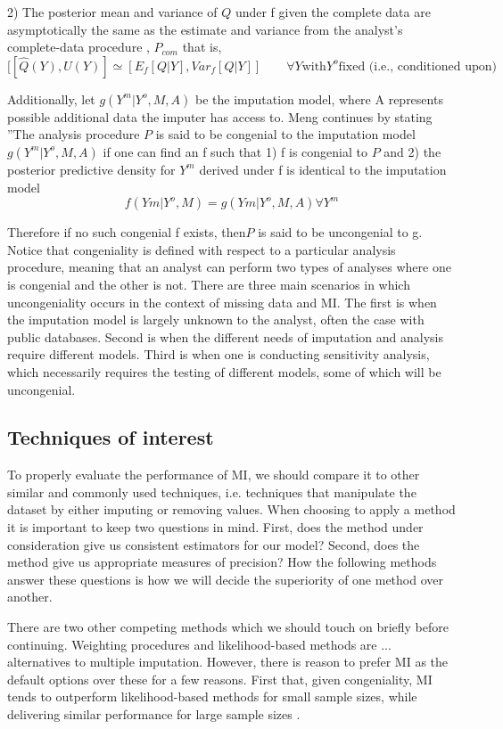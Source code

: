 \documentclass{article}
\begin{document}
	2)  The posterior mean and variance of $Q$ under
	f given the complete data are asymptotically the
	same as the estimate and variance from the analyst's
	complete-data procedure , $P_{com}$ that is, $$[[\hat{Q}(Y), U(Y)]\simeq [E_{f}[Q|{Y}], Var_{f}[Q|{Y}]]\qquad \forall Y\textrm{with}Y^{o}\textrm{fixed (i.e., conditioned upon)}$$
	
	Additionally, let $g(Y^{m}|{Y^{o}, M}, A)$ be the imputation model, where A represents possible additional data the imputer has access to. Meng continues by stating ''The analysis procedure $P$ is said to be congenial to the imputation model $g(Y^{m}|{Y^{o}, M}, A)$ if one can find an f such that 1) f is congenial to $P$ and 2) the posterior predictive density for $Y^{m}$ derived under f is identical to the imputation model $$f(Y{m}|{Y^{o}, M}) = g(Y{m}|{Y^{o}, M}, A) \forall Y^{m}$$
	
	Therefore if no such congenial f exists, then$P$ is said to be uncongenial to g. Notice that congeniality is defined with respect to a particular analysis procedure, meaning that an analyst can perform two types of analyses where one is congenial and the other is not. There are three main scenarios in which uncongeniality occurs in the context of missing data and MI. The first is when the imputation model is largely unknown to the analyst, often the case with public databases. Second is when the different needs of imputation and analysis require different models. Third is when one is conducting sensitivity analysis, which necessarily requires the testing of different models, some of which will be uncongenial.
	
	
	
	\subsection{Techniques of interest}
	To properly evaluate the performance of MI, we should compare it to other similar and commonly used techniques, i.e. techniques that manipulate the dataset by either imputing or removing values. When choosing to apply a method it is important to keep two questions in mind. First, does the method under consideration give us consistent estimators for our model? Second, does the method give us appropriate measures of precision? How the following methods answer these questions is how we will decide the superiority of one method over another.
	
	There are two other competing methods which we should touch on briefly before continuing. Weighting procedures and likelihood-based methods are ... alternatives to multiple imputation. However, there is reason to prefer MI as the default options over these for a few reasons. First that, given congeniality, MI tends to outperform likelihood-based methods for small sample sizes, while delivering similar performance for large sample sizes \cite{schafer_multiple_2016}.
	
\end{document}
